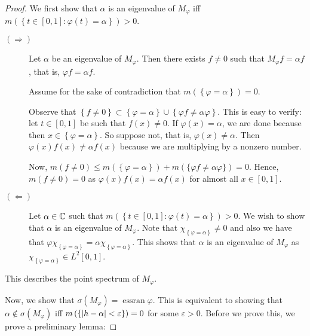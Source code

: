 \begin{proof}
    We first show that $\alpha$ is an eigenvalue of $M_{\varphi}$ iff $m\left( \left\{ t\in [0,1] : \varphi \left( t \right) = \alpha \right\} \right) > 0$. 

    \begin{description}
	\item[$\left( \Longrightarrow \right)$] Let $\alpha$ be an eigenvalue of $M_{\varphi}$. Then there exists $f \ne 0$ such that $M_{\varphi} f = \alpha f$, that is, $\varphi f = \alpha f$.

	    Assume for the sake of contradiction that $m\left( \left\{ \varphi =\alpha \right\} \right) = 0$.

	    Observe that $\left\{ f\ne 0 \right\} \subset \left\{ \varphi = \alpha \right\} \cup \left\{ \varphi f \ne \alpha \varphi \right\}$. This is easy to verify: let $t \in [0,1]$ be such that $f(x)\ne 0$. If $\varphi (x) = \alpha$, we are done because then $x \in \left\{ \varphi = \alpha \right\}$. So suppose not, that is, $\varphi(x) \ne \alpha$. Then $\varphi (x) f (x) \ne \alpha f(x)$ because we are multiplying by a nonzero number.

	    Now, $m\left( f\ne 0 \right) \le m \left( \left\{ \varphi =\alpha \right\} \right) + m \left( \{\varphi f \ne \alpha \varphi \} \right) = 0$. Hence, $m \left( f\ne 0 \right) = 0$ as $\varphi (x) f(x) = \alpha f(x)$ for almost all $x\in [0,1]$.
	\item[$\left( \Longleftarrow \right)$] Let $\alpha \in \mathbb C$ such that $m \left( \left\{ t \in [0,1] : \varphi (t) = \alpha \right\} \right) > 0$. We wish to show that $\alpha$ is an eigenvalue of $M_{\varphi}$. Note that $\chi_{\left\{ \varphi = \alpha \right\}} \ne 0$ and also we have that $\varphi \chi_{ \left\{ \varphi = \alpha \right\}} = \alpha \chi_{ \left\{ \varphi = \alpha \right\}}$. This shows that $\alpha$ is an eigenvalue of $M_{\varphi}$ as $\chi_{ \left\{ \varphi=\alpha \right\}} \in L^{2} \left[ 0,1 \right]$.
    \end{description}

    This describes the point spectrum of $M_{\varphi}$.


    Now, we show that $\sigma \left( M_{\varphi} \right) = \operatorname{ess ran} \varphi$. This is equivalent to showing that $\alpha \not\in \sigma \left( M_{\varphi} \right)$ iff $m \left( \left\{ \left\lvert h-\alpha \right\rvert < \varepsilon \right\} \right) =0$ for some $\varepsilon > 0$. Before we prove this, we prove a preliminary lemma:


\end{proof}

